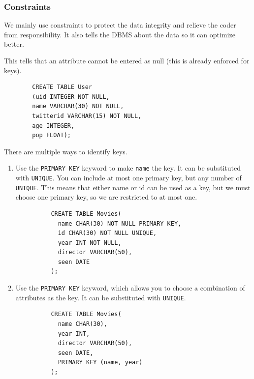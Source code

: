   \subsubsection{Constraints}

    We mainly use constraints to protect the data integrity and relieve the coder from responsibility. It also tells the DBMS about the data so it can optimize better. 

    \begin{definition}
      This tells that an attribute cannot be entered as null (this is already enforced for keys). 
      \begin{lstlisting}
        CREATE TABLE User 
        (uid INTEGER NOT NULL, 
        name VARCHAR(30) NOT NULL, 
        twitterid VARCHAR(15) NOT NULL, 
        age INTEGER, 
        pop FLOAT); 
      \end{lstlisting}
    \end{definition}

    \begin{definition}
      There are multiple ways to identify keys. 
      \begin{enumerate}
        \item Use the \texttt{PRIMARY KEY} keyword to make \texttt{name} the key. It can be substituted with \texttt{UNIQUE}. You can include at most one primary key, but any number of \texttt{UNIQUE}. This means that either name or id can be used as a key, but we must choose one primary key, so we are restricted to at most one. 
        \begin{lstlisting}
          CREATE TABLE Movies(
            name CHAR(30) NOT NULL PRIMARY KEY,
            id CHAR(30) NOT NULL UNIQUE,
            year INT NOT NULL, 
            director VARCHAR(50), 
            seen DATE
          ); 
        \end{lstlisting}

        \item Use the \texttt{PRIMARY KEY} keyword, which allows you to choose a combination of attributes as the key. It can be substituted with \texttt{UNIQUE}. 
        \begin{lstlisting}
          CREATE TABLE Movies(
            name CHAR(30),
            year INT, 
            director VARCHAR(50), 
            seen DATE, 
            PRIMARY KEY (name, year)
          ); 
        \end{lstlisting}
      \end{enumerate}
    \end{definition}

